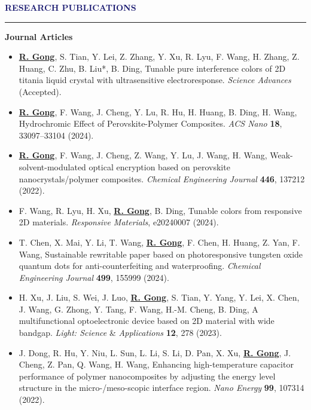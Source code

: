 \documentclass{resume} %
\renewenvironment{rSection}[1]{
\sectionskip
\textcolor{MidnightBlue}{\MakeUppercase{#1}}
\sectionlineskip
\hrule
\begin{list}{}{
\setlength{\leftmargin}{0em}
}
\item[]
}{
\end{list}
}
\begin{document}
\begin{rSection}{\textbf{Research Publications}} \itemsep -3pt        

{
\textbf{ Journal Articles}
\begin{itemize}
    \item \underline{\textbf{R. Gong}}, S. Tian, Y. Lei, Z. Zhang, Y. Xu, R. Lyu, F. Wang, H. Zhang, Z. Huang, C. Zhu, B. Liu*, B. Ding, Tunable pure interference colors of 2D titania liquid crystal with ultrasensitive electroresponse. \textit{\textit{Science Advances}} (Accepted).

\end{itemize}
\begin{itemize}
    \item \underline{\textbf{R. Gong}}, F. Wang, J. Cheng, Y. Lu, R. Hu, H. Huang, B. Ding, H. Wang, Hydrochromic Effect of Perovskite-Polymer Composites. \textit{\textit{ACS Nano}} \textbf{\textbf{18}}, 33097–33104 (2024).
    \item \underline{\textbf{R. Gong}}, F. Wang, J. Cheng, Z. Wang, Y. Lu, J. Wang, H. Wang, Weak-solvent-modulated optical encryption based on perovskite nanocrystals/polymer composites. \textit{\textit{Chemical Engineering Journal}} \textbf{\textbf{446}}, 137212 (2022).
    \item F. Wang, R. Lyu, H. Xu, \underline{\textbf{R. Gong}}, B. Ding, Tunable colors from responsive 2D materials. \textit{\textit{Responsive Materials}}, e20240007 (2024).
    \item T. Chen, X. Mai, Y. Li, T. Wang, \underline{\textbf{R. Gong}}, F. Chen, H. Huang, Z. Yan, F. Wang, Sustainable rewritable paper based on photoresponsive tungsten oxide quantum dots for anti-counterfeiting and waterproofing. \textit{\textit{Chemical Engineering Journal}} \textbf{\textbf{499}}, 155999 (2024).
    \item     H. Xu, J. Liu, S. Wei, J. Luo, \underline{\textbf{R. Gong}}, S. Tian, Y. Yang, Y. Lei, X. Chen, J. Wang, G. Zhong, Y. Tang, F. Wang, H.-M. Cheng, B. Ding, A multifunctional optoelectronic device based on 2D material with wide bandgap. \textit{Light: Science} \& \textit{Applications} \textbf{\textbf{12}}, 278 (2023).
    \item J. Dong, R. Hu, Y. Niu, L. Sun, L. Li, S. Li, D. Pan, X. Xu, \underline{\textbf{R. Gong}}, J. Cheng, Z. Pan, Q. Wang, H. Wang, Enhancing high-temperature capacitor performance of polymer nanocomposites by adjusting the energy level structure in the micro-/meso-scopic interface region. \textit{\textit{Nano Energy}} \textbf{\textbf{99}}, 107314 (2022).

\end{itemize}}
\end{rSection}
\end{document}
